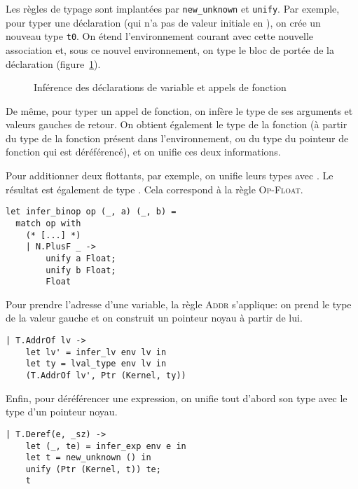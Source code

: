 Les règles de typage sont implantées par \texttt{new\_unknown} et
\texttt{unify}. Par exemple, pour typer une déclaration (qui n'a pas de valeur
initiale en \newspeak), on crée un nouveau type \texttt{t0}. On étend
l'environnement courant avec cette nouvelle association et, sous ce nouvel
environnement, on type le bloc de portée de la déclaration
(figure~\ref{fig:implem-unif-stmt}).

\begin{figure}[h] %


\caption{Inférence des déclarations de variable et appels de
         fonction}

\label{fig:implem-unif-stmt}
\end{figure}%

De même, pour typer un appel de fonction, on infère le type de ses arguments et
valeurs gauches de retour. On obtient également le type de la fonction (à partir
du type de la fonction présent dans l'environnement, ou du type du pointeur de
fonction qui est déréférencé), et on unifie ces deux informations.

Pour additionner deux flottants, par exemple, on unifie leurs types avec
\tFloat. Le résultat est également de type \tFloat. Cela correspond à la règle
\textsc{Op-Float}.

\begin{verbatim}
let infer_binop op (_, a) (_, b) =
  match op with
    (* [...] *)
    | N.PlusF _ ->
        unify a Float;
        unify b Float;
        Float
\end{verbatim}

Pour prendre l'adresse d'une variable, la règle \textsc{Addr} s'applique: on
prend le type de la valeur gauche et on construit un pointeur noyau à partir de
lui.

\begin{verbatim}
| T.AddrOf lv ->
    let lv' = infer_lv env lv in
    let ty = lval_type env lv in
    (T.AddrOf lv', Ptr (Kernel, ty))
\end{verbatim}

Enfin, pour déréférencer une expression, on unifie tout d'abord son type avec le
type d'un pointeur noyau.

\begin{verbatim}
| T.Deref(e, _sz) ->
    let (_, te) = infer_exp env e in
    let t = new_unknown () in
    unify (Ptr (Kernel, t)) te;
    t
\end{verbatim}

